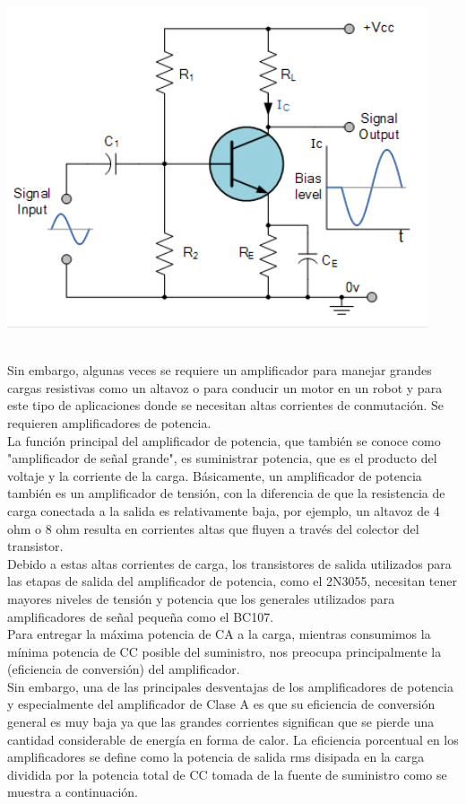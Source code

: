 \documentclass[10pt,a4paper]{article}
\begin{document}
\begin{center}
\includegraphics[scale=0.5]{img.png}\\\
\end{center}
Sin embargo, algunas veces se requiere un amplificador para manejar grandes cargas resistivas como un altavoz o para conducir un motor en un robot y para este tipo de aplicaciones donde se necesitan altas corrientes de conmutación. Se requieren amplificadores de potencia.\\
La función principal del amplificador de potencia, que también se conoce como "amplificador de señal grande", es suministrar potencia, que es el producto del voltaje y la corriente de la carga. Básicamente, un amplificador de potencia también es un amplificador de tensión, con la diferencia de que la resistencia de carga conectada a la salida es relativamente baja, por ejemplo, un altavoz de 4 ohm o 8 ohm resulta en corrientes altas que fluyen a través del colector del transistor.\\
Debido a estas altas corrientes de carga, los transistores de salida utilizados para las etapas de salida del amplificador de potencia, como el 2N3055, necesitan tener mayores niveles de tensión y potencia que los generales utilizados para amplificadores de señal pequeña como el BC107.\\
Para entregar la máxima potencia de CA a la carga, mientras consumimos la mínima potencia de CC posible del suministro, nos preocupa principalmente la (eficiencia de conversión) del amplificador.\\
Sin embargo, una de las principales desventajas de los amplificadores de potencia y especialmente del amplificador de Clase A es que su eficiencia de conversión general es muy baja ya que las grandes corrientes significan que se pierde una cantidad considerable de energía en forma de calor. La eficiencia porcentual en los amplificadores se define como la potencia de salida rms disipada en la carga dividida por la potencia total de CC tomada de la fuente de suministro como se muestra a continuación.\\
\end{document}
